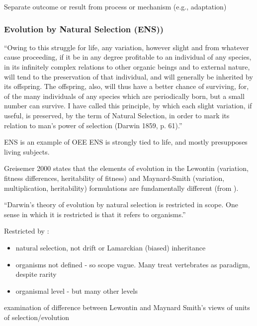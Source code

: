 Separate outcome or result from process or mechanism (e.g., adaptation)


\subsubsection{Evolution by Natural Selection (ENS))}\label{ens-evolution-by-natural-selection}

``Owing to this struggle for life, any variation, however slight and
from whatever cause proceeding, if it be in any degree profitable to
an individual of any species, in its infinitely complex relations to
other organic beings and to external nature, will tend to the
preservation of that individual, and will generally be inherited by
its offspring. The offspring, also, will thus have a better chance
of surviving, for, of the many individuals of any species which are
periodically born, but a small number can survive. I have called
this principle, by which each slight variation, if useful, is
preserved, by the term of Natural Selection, in order to mark its
relation to man's power of selection (Darwin 1859, p. 61).'' \autocite{Griesemer2005}

ENS is an example of OEE
ENS is strongly tied to life, and mostly presupposes living subjects.

Greisemer 2000 states that the elements of evolution in the Lewontin (variation, fitness differences, heritability of fitness) and Maynard-Smith (variation, multiplication, heritability) formulations are fundamentally different (from \autocite{Vasas2015}).


``Darwin's theory of evolution by natural selection is restricted in scope. One sense in which it is restricted is that it refers to organisms.'' \autocite{Griesemer2005}

Restricted by \autocite{Griesemer2005}:
\begin{itemize}
	\item natural selection, not drift or Lamarckian (biased) inheritance
	\item organisms not defined - so scope vague. Many treat vertebrates as paradigm, despite rarity
	\item organismal level - but many other levels
\end{itemize}

\autocite{Griesemer2001}

examination of difference between Lewontin and Maynard Smith's views
of units of selection/evolution

